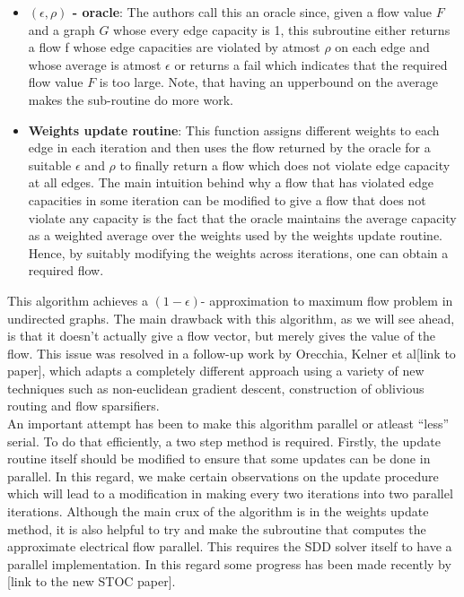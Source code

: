 \documentclass[BTech]{iitmdiss}
\begin{document}
	 \begin{itemize}
	  \item 
	    \textbf{$(\epsilon, \rho)$ - oracle}: The authors call this an oracle since, given a flow value $F$ and a graph $G$ whose every
	    edge capacity is 1, this subroutine either returns a flow f whose edge capacities are violated by atmost $\rho$ on each edge 
	    and whose average is atmost $\epsilon$ or returns a fail which indicates that the required flow value $F$ is too large. Note, that 
	    having an upperbound on the average makes the sub-routine do more work.
	  \item
	    \textbf{Weights update routine}: This function assigns different weights to each edge in each iteration and then uses the flow returned 
	    by the oracle for a suitable $\epsilon$ and $\rho$ to finally return a flow which does not violate edge capacity at all edges. The main 
	    intuition behind why a flow that has violated edge capacities in some iteration can be modified to give a flow that does not violate 
	    any capacity is the fact that the oracle maintains the average capacity as a weighted average over the weights used by the weights
	    update routine. Hence, by suitably modifying the weights across iterations, one can obtain a required flow.
	 \end{itemize}

	  This algorithm achieves a $(1- \epsilon)$- approximation to maximum flow problem in undirected graphs. The main drawback with this algorithm,
	  as we will see ahead, is that it doesn't actually give a flow vector, but merely gives the value of the flow. This issue was resolved 
	  in a follow-up work by Orecchia, Kelner et al[link to paper], which adapts a completely different approach using a variety of new techniques
	  such as non-euclidean gradient descent, construction of oblivious routing and flow sparsifiers. \\
	  
	  An important attempt has been to make this algorithm parallel or atleast ``less'' serial. To do that efficiently, a two step method is 
	  required. Firstly, the update routine itself should be modified to ensure that some updates can be done in parallel. In this regard, we make
	  certain observations on the update procedure which will lead to a modification in making every two iterations into two parallel iterations.
	  Although the main crux of the algorithm is in the weights update method, it is also helpful to try and make the subroutine that computes the
	  approximate electrical flow parallel. This requires the SDD solver itself to have a parallel implementation. In this regard some progress has
	  been made recently by [link to the new STOC paper].
	  
\end{document}
